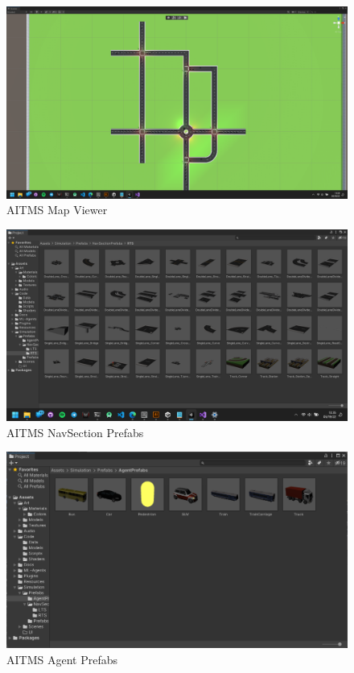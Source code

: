 \documentclass[openany,12pt]{report}
\begin{document}
		\begin{figure}[H]
			\centering
			\includegraphics[width=6in]{./Diagrams/PNG/fulllive}
			\caption{AITMS Map Viewer}
		\end{figure}
		
		\begin{figure}[H]
			\centering
			\includegraphics[width=6in]{./Diagrams/PNG/prefabs}
			\caption{AITMS NavSection Prefabs}
		\end{figure}
		
		\begin{figure}[H]
			\centering
			\includegraphics[width=6in]{./Diagrams/PNG/agent}
			\caption{AITMS Agent Prefabs}
		\end{figure}
		
\end{document}
